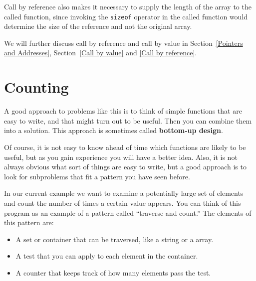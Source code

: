 Call by reference also makes it necessary to supply the length of
the array to the called function, since invoking  the {\tt sizeof}
operator in the called function would determine the size of the reference
and not the original array.

We will further discuss call by reference and call by value in 
Section~\ref{Pointers and Addresses}, Section~\ref{Call by value} and
\ref{Call by reference}.

\section{Counting}
\label{counting}

A good approach to problems like this is to think of simple functions
that are easy to write, and that might turn out to be useful.  Then
you can combine them into a solution.  This approach is sometimes
called {\bf bottom-up design}.  

Of course, it is not easy to
know ahead of time which functions are likely to be useful, but as you
gain experience you will have a better idea.
Also, it is not always obvious what sort of things are easy to write,
but a good approach is to look for subproblems that fit a pattern you
have seen before.


In our current example we want to examine a potentially large set
of elements and count the number of times a certain value appears.
You
can think of this program as an example of a pattern called ``traverse
and count.''  The elements of this pattern are:

\begin{itemize}

\item A set or container that can be traversed, like a string
or a array.

\item A test that you can apply to each element in the container.

\item A counter that keeps track of how many elements pass
the test.

\end{itemize}


